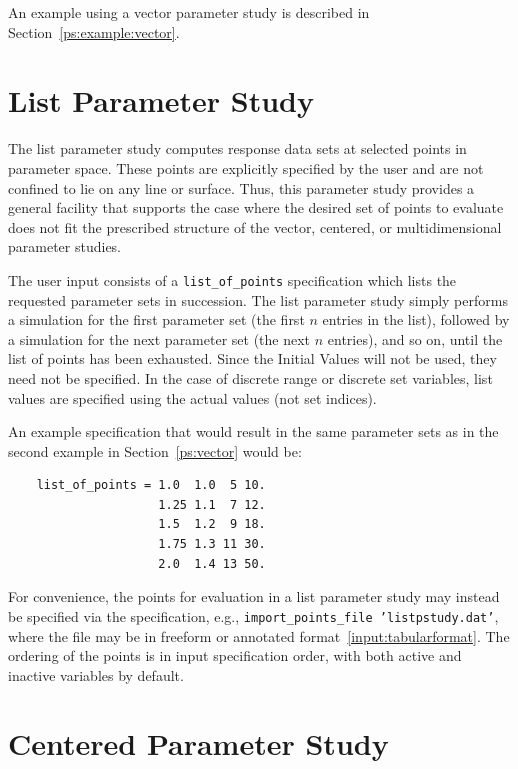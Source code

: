 An example using a vector parameter study is described in 
Section~\ref{ps:example:vector}.

\section{List Parameter Study}\label{ps:list}

The list parameter study computes response data sets at selected
points in parameter space. These points are explicitly specified by
the user and are not confined to lie on any line or surface. Thus,
this parameter study provides a general facility that supports the
case where the desired set of points to evaluate does not fit the
prescribed structure of the vector, centered, or multidimensional
parameter studies.

The user input consists of a \texttt{list\_of\_points} specification
which lists the requested parameter sets in succession. The list
parameter study simply performs a simulation for the first parameter
set (the first $n$ entries in the list), followed by a simulation for
the next parameter set (the next $n$ entries), and so on, until the
list of points has been exhausted. Since the Initial Values will not
be used, they need not be specified.  In the case of discrete range or
discrete set variables, list values are specified using the actual
values (not set indices).

An example specification that would result in the same parameter sets
as in the second example in Section~\ref{ps:vector} would be:
\begin{small}
\begin{verbatim}
    list_of_points = 1.0  1.0  5 10.
                     1.25 1.1  7 12.
                     1.5  1.2  9 18.
                     1.75 1.3 11 30.
                     2.0  1.4 13 50.
\end{verbatim}
\end{small}

For convenience, the points for evaluation in a list parameter study
may instead be specified via the 
specification, e.g., {\tt import\_points\_file 'listpstudy.dat'},
where the file  may be in freeform or annotated
format~\ref{input:tabularformat}.  The ordering of the points is in
input specification order, with both active and inactive variables by
default.

\section{Centered Parameter Study}\label{ps:centered}

